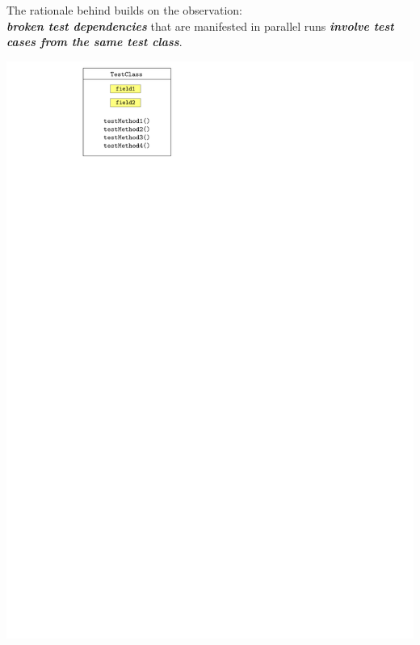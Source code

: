 \documentclass{beamer}
\begin{document}
{\begin{frame}{The rationale behind \textbf{\tname}}
	\textbf{\tname} builds on the observation:\\
	{\rsm \textit{\textbf{broken test dependencies}}} that are manifested in parallel runs {\rsm \textit{\textbf{involve test cases from the same test class}}}.
	\begin{center}
		\begin{minipage}{0.48\linewidth}
			\centering
			\includegraphics[width=\linewidth,page=5]{images/flakes.pdf}
		\end{minipage}%
		\hfill
		\begin{minipage}{0.48\linewidth}
			\centering

\end{minipage}
\end{center}
\end{frame}}
\end{document}
